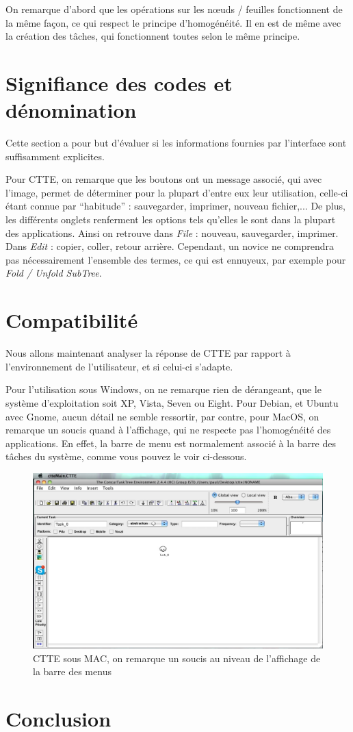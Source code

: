 \documentclass[12pt, a4paper]{article}
\begin{document}
On remarque d'abord que les opérations sur les nœuds / feuilles fonctionnent de la même façon, ce qui respect le principe d'homogénéité. Il en est de même avec la création des tâches, qui fonctionnent toutes selon le même principe.

\section{Signifiance des codes et dénomination}
Cette section a pour but d'évaluer si les informations fournies par l'interface sont suffisamment explicites.

Pour CTTE, on remarque que les boutons ont un message associé, qui avec l'image, permet de déterminer pour la plupart d'entre eux leur utilisation, celle-ci étant connue par ``habitude'' : sauvegarder, imprimer, nouveau fichier,... De plus, les différents onglets renferment les options tels qu'elles le sont dans la plupart des applications. Ainsi on retrouve dans \emph{File} : nouveau, sauvegarder, imprimer. Dans \emph{Edit} : copier, coller, retour arrière. Cependant, un novice ne comprendra pas nécessairement l'ensemble des termes, ce qui est ennuyeux, par exemple pour \emph{Fold / Unfold SubTree}.

\section{Compatibilité}
Nous allons maintenant analyser la réponse de CTTE par rapport à l'environnement de l'utilisateur, et si celui-ci s'adapte.


Pour l'utilisation sous Windows, on ne remarque rien de dérangeant, que le système d'exploitation soit XP, Vista, Seven ou Eight. Pour Debian, et Ubuntu avec Gnome, aucun détail ne semble ressortir, par contre, pour MacOS, on remarque un soucis quand à l'affichage, qui ne respecte pas l'homogénéité des applications. En effet, la barre de menu est normalement associé à la barre des tâches du système, comme vous pouvez le voir ci-dessous.

\begin{figure}
   \includegraphics[scale = 0.5]{SoucisIHM.jpg}
	\caption{CTTE sous MAC, on remarque un soucis au niveau de l'affichage de la barre des menus}
\end{figure}

\section{Conclusion}
\end{document}
